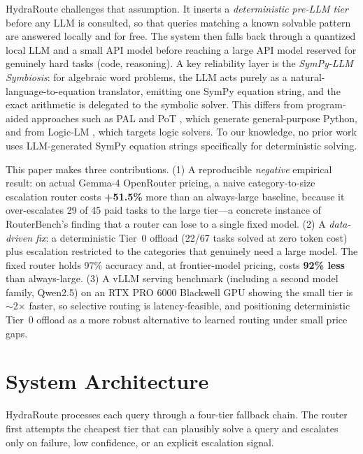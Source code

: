 \documentclass[11pt]{article}
\newcommand{\system}{HydraRoute\xspace}
\begin{document}
\system challenges that assumption. It inserts a \emph{deterministic pre-LLM tier} before any LLM is consulted, so that queries matching a known solvable pattern are answered locally and for free. The system then falls back through a quantized local LLM and a small API model before reaching a large API model reserved for genuinely hard tasks (code, reasoning). A key reliability layer is the \emph{SymPy-LLM Symbiosis}: for algebraic word problems, the LLM acts purely as a natural-language-to-equation translator, emitting one SymPy equation string, and the exact arithmetic is delegated to the symbolic solver. This differs from program-aided approaches such as PAL \cite{gao2022pal} and PoT \cite{chen2022pot}, which generate general-purpose Python, and from Logic-LM \cite{pan2023logiclm}, which targets logic solvers. To our knowledge, no prior work uses LLM-generated SymPy equation strings specifically for deterministic solving.

This paper makes three contributions. (1) A reproducible \emph{negative} empirical result:
on actual Gemma-4 OpenRouter pricing, a naive category-to-size escalation router costs
\textbf{+51.5\%} more than an always-large baseline, because it over-escalates 29 of 45
paid tasks to the large tier---a concrete instance of RouterBench's finding that a router
can lose to a single fixed model. (2) A \emph{data-driven fix}: a deterministic Tier~0
offload (22/67 tasks solved at zero token cost) plus escalation restricted to the categories
that genuinely need a large model. The fixed router holds 97\% accuracy and, at
frontier-model pricing, costs \textbf{92\% less} than always-large. (3) A vLLM serving
benchmark (including a second model family, Qwen2.5) on an RTX PRO 6000 Blackwell GPU showing
the small tier is $\sim$2$\times$ faster, so selective routing is latency-feasible, and
positioning deterministic Tier~0 offload as a more robust alternative to learned routing
under small price gaps.

\section{System Architecture}
\label{sec:arch}

\system processes each query through a four-tier fallback chain. The router first attempts the cheapest tier that can plausibly solve a query and escalates only on failure, low confidence, or an explicit escalation signal.
\end{document}
